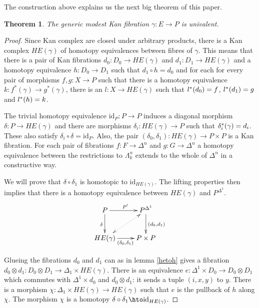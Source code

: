 \documentclass{amsart}
\theoremstyle{plain}
\newtheorem{theorem}{Theorem}
\theoremstyle{definition}
\newcommand\id{\mathrm{id}}
\begin{document}
The construction above explains us the next big theorem of this paper.

\begin{theorem} The generic modest Kan fibration $\gamma:E\to P$ is univalent. \end{theorem}

\begin{proof} Since Kan complex are closed under arbitrary products, there is a Kan complex $HE(\gamma)$ of homotopy equivalences between fibres of $\gamma$. This means that there is a pair of Kan fibrations $d_0:D_0 \to HE(\gamma)$ and $d_1:D_1\to HE(\gamma)$ and a homotopy equivalence $h:D_0\to D_1$ such that $d_1\circ h = d_0$ and for each for every pair of morphisms $f,g:X\to P$ such that there is a homotopy equivalence $k:f^*(\gamma)\to g^*(\gamma)$, there is an $l:X\to HE(\gamma)$ such that $l^*(d_0) = f$, $l^*(d_1)=g$ and $l^*(h) = k$. 

The trivial homotopy equivalence $\id_P: P\to P$ induces a diagonal morphism $\delta:P\to HE(\gamma)$ and there are morphisms $\delta_i:HE(\gamma) \to P$ such that $\delta_i^*(\gamma) = d_i$. These also satisfy $\delta_i\circ \delta = \id_P$. Also, the pair $(\delta_0,\delta_1):HE(\gamma) \to P\times P$ is a Kan fibration. For each pair of fibrations $f:F\to \Delta^n$ and $g:G\to \Delta^n$ a homotopy equivalence between the restrictions to $\Lambda^n_k$ extends to the whole of $\Delta^n$ in a constructive way.

We will prove that $\delta\circ \delta_1$ is homotopic to $\id_{HE(\gamma)}$. The lifting properties then implies that there is a homotopy equivalence between $HE(\gamma)$ and $P^{\Delta^1}$.
\[ \xymatrix{
P \ar[r]^{P^!} \ar[d]_{\delta} & P^{\Delta^1} \ar[d]^{(d_0,d_1)} \\
HE(\gamma) \ar[r]_{(\delta_0,\delta_1)} \ar@{<.>}[ur] & P\times P
}\]

Glueing the fibrations $d_0$ and $d_1$ can as in lemma \ref{hetoh} gives a fibration $d_0\otimes d_1: D_0\otimes D_1\to \Delta_1\times HE(\gamma)$. There is an equivalence $e:\Delta^1\times D_0 \to D_0\otimes D_1$ which commutes with $\Delta^1\times d_0$ and $d_0\otimes d_1$: it sends a tuple $(i,x,y)$ to $y$. There is a morphism $\chi: \Delta_1\times HE(\gamma) \to HE(\gamma)$ such that $e$ is the pullback of $h$ along $\chi$. The morphism $\chi$ is a homotopy $\delta\circ \delta_1\hto\id_{HE(\gamma)}$.
\end{proof}
\end{document}

